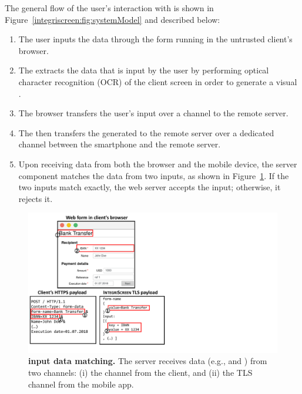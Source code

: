 The general flow of the user's interaction with \sysname is shown in Figure~\ref{integriscreen:fig:systemModel} and described below:
\begin{enumerate} %
  \item[\one] The user inputs the data through the form running in the untrusted client's browser.

  \item[\two] The \app extracts the data that is input by the user by performing optical character recognition (OCR) of the client screen in order to generate a visual \POI.

  \item[\three] The browser transfers the user's input over a \https channel to the remote server.

  \item[\four] The \app then transfers the generated \POI to the remote server over a dedicated \tls channel between the smartphone and the remote server.

  \item[\five] Upon receiving data from both the browser and the mobile device, the \name server component matches the data from two inputs, as shown in Figure~\ref{fig:traceMatching}.
  If the two inputs match exactly, the web server accepts the input; otherwise, it rejects it.
\end{enumerate}



\begin{figure}[t]
    \centering
    \includegraphics[trim={0 1cm 15cm 0},clip,width=0.7\linewidth]{chapters/IntegriScreen/img/inputMatching.pdf}
\caption[\sysname input data matching.]{\textbf{\sysname input data matching.}
        The server receives data (e.g., \one and \two) from two channels: (i) the \https channel from the client, and (ii) the TLS channel from the \name mobile app.}
    \label{fig:traceMatching}
    \vspace{0.3cm}
\end{figure}



